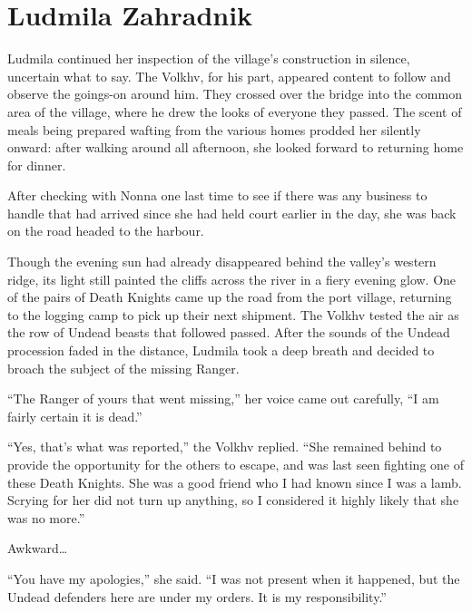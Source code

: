 \chapter{Ludmila Zahradnik}

Ludmila continued her inspection of the village’s construction in silence, uncertain what to say. The Volkhv, for his part, appeared content to follow and observe the goings-on around him. They crossed over the bridge into the common area of the village, where he drew the looks of everyone they passed. The scent of meals being prepared wafting from the various homes prodded her silently onward: after walking around all afternoon, she looked forward to returning home for dinner.

 

After checking with Nonna one last time to see if there was any business to handle that had arrived since she had held court earlier in the day, she was back on the road headed to the harbour.

 

Though the evening sun had already disappeared behind the valley’s western ridge, its light still painted the cliffs across the river in a fiery evening glow. One of the pairs of Death Knights came up the road from the port village, returning to the logging camp to pick up their next shipment. The Volkhv tested the air as the row of Undead beasts that followed passed. After the sounds of the Undead procession faded in the distance, Ludmila took a deep breath and decided to broach the subject of the missing Ranger.

 

“The Ranger of yours that went missing,” her voice came out carefully, “I am fairly certain it is dead.”

 

“Yes, that’s what was reported,” the Volkhv replied. “She remained behind to provide the opportunity for the others to escape, and was last seen fighting one of these Death Knights. She was a good friend who I had known since I was a lamb. Scrying for her did not turn up anything, so I considered it highly likely that she was no more.”

 

Awkward…

 

“You have my apologies,” she said. “I was not present when it happened, but the Undead defenders here are under my orders. It is my responsibility.”

 

